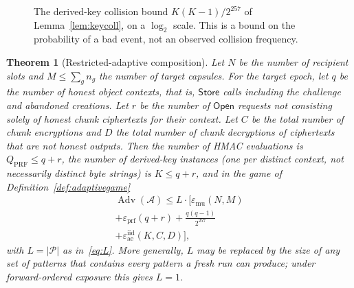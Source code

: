 \documentclass[pdflatex,sn-mathphys-num,twocolumn]{sn-jnl}
\theoremstyle{plain}
\newtheorem{theorem}{Theorem}
\theoremstyle{definition}
\newcommand{\Adv}{\operatorname{Adv}}
\begin{document}
\begin{figure}[htbp]
\centering

\caption{The derived-key collision bound $K(K-1)/2^{257}$ of Lemma~\ref{lem:keycoll}, on a $\log_2$ scale. This is a bound on the probability of a bad event, not an observed collision frequency.}\label{fig:keycoll}
\end{figure}

\begin{keyresult}
\begin{theorem}[Restricted-adaptive composition]\label{thm:adaptive}
Let $N$ be the number of recipient slots and $M\le\sum_gn_g$ the number of target capsules. For the target epoch, let $q$ be the number of honest object contexts, that is, $\mathsf{Store}$ calls including the challenge and abandoned creations. Let $r$ be the number of $\mathsf{Open}$ requests not consisting solely of honest chunk ciphertexts for their context. Let $C$ be the total number of chunk encryptions and $D$ the total number of chunk decryptions of ciphertexts that are not honest outputs. Then the number of HMAC evaluations is $Q_{\mathrm{PRF}}\le q+r$, the number of derived-key \emph{instances} (one per distinct context, not necessarily distinct byte strings) is $K\le q+r$, and in the game of Definition~\ref{def:adaptivegame}
\begin{multline}\label{eq:adaptive}
 \Adv(\mathcal A)\le L\cdot\Big[\varepsilon_{\mathrm{mu}}(N,M)\\
 +\varepsilon_{\mathrm{prf}}(q+r)+\frac{q(q-1)}{2^{257}}\\
 +\varepsilon^{\mathrm{iid}}_{\mathrm{ae}}(K,C,D)\Big],
\end{multline}
with $L=|\mathcal P|$ as in~\eqref{eq:L}. More generally, $L$ may be replaced by the size of any set of patterns that contains every pattern a fresh run can produce; under forward-ordered exposure this gives $L=1$.
\end{theorem}
\end{keyresult}
\end{document}
